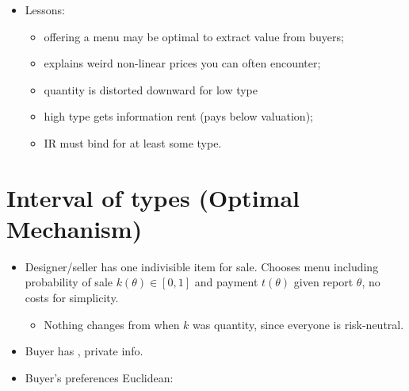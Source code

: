 \documentclass[english,handout,10pt]{beamer}		%
\def\lyxframeend{} %
\begin{document}
\begin{itemize}
	\item Lessons:
	\begin{itemize}[<+->]
		\item offering a menu may be optimal to extract value from buyers;
		\item explains weird non-linear prices you can often encounter; %
		\item quantity is distorted downward for low type
		\item high type gets information rent (pays below valuation);
		\item IR must bind for at least some type.
	\end{itemize}
\end{itemize}
\lyxframeend


\section{Interval of types (Optimal Mechanism)}

\begin{itemize}
	\item Designer/seller has one indivisible item for sale. Chooses menu including probability of sale $k(\theta) \in [0,1]$ and payment $t(\theta)$ given report $\theta$, no costs for simplicity.
	\begin{itemize}
		\item Nothing changes from when $k$ was quantity, since everyone is risk-neutral.
	\end{itemize}
	\item Buyer has , private info.
	\item Buyer's preferences Euclidean: 
\end{itemize}
\lyxframeend
\end{document}
